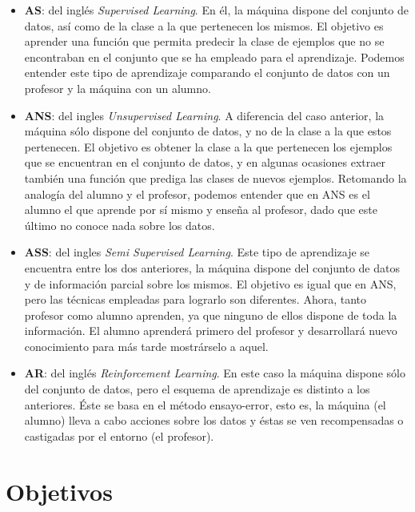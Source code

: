 \begin{itemize}
	
	\item \textbf{\acf{AS}}: del inglés \textit{Supervised Learning}. En él, la máquina dispone del conjunto de datos, así como de la clase a la que pertenecen los mismos. El objetivo es aprender una función que permita predecir la clase de ejemplos que no se encontraban en el conjunto que se ha empleado para el aprendizaje. Podemos entender este tipo de aprendizaje comparando el conjunto de datos con un profesor y la máquina con un alumno.
	
	\item \textbf{\acf{ANS}}: del ingles \textit{Unsupervised Learning}. A diferencia del caso anterior, la máquina sólo dispone del conjunto de datos, y no de la clase a la que estos pertenecen. El objetivo es obtener la clase a la que pertenecen los ejemplos que se encuentran en el conjunto de datos, y en algunas ocasiones extraer también una función que prediga las clases de nuevos ejemplos. Retomando la analogía del alumno y el profesor, podemos entender que en \acs{ANS} es el alumno el que aprende por sí mismo y enseña al profesor, dado que este último no conoce nada sobre los datos.
	
	\item \textbf{\acf{ASS}}: del ingles \textit{Semi Supervised Learning}. Este tipo de aprendizaje se encuentra entre los dos anteriores, la máquina dispone del conjunto de datos y de información parcial sobre los mismos. El objetivo es igual que en \acs{ANS}, pero las técnicas empleadas para lograrlo son diferentes. Ahora, tanto profesor como alumno aprenden, ya que ninguno de ellos dispone de toda la información. El alumno aprenderá primero del profesor y desarrollará nuevo conocimiento para más tarde mostrárselo a aquel.
	
	\item \textbf{\acf{AR}}: del inglés \textit{Reinforcement Learning}. En este caso la máquina dispone sólo del conjunto de datos, pero el esquema de aprendizaje es distinto a los anteriores. Éste se basa en el método ensayo-error, esto es, la máquina (el alumno) lleva a cabo acciones sobre los datos y éstas se ven recompensadas o castigadas por el entorno (el profesor).
	
\end{itemize}

\section{Objetivos}

